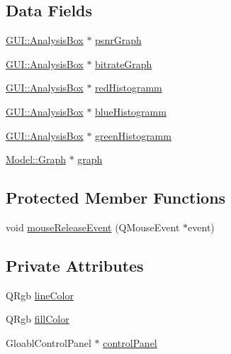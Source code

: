 \subsection*{Data Fields}
\begin{DoxyCompactItemize}
\item 
\hyperlink{classGUI_1_1AnalysisBox}{G\+U\+I\+::\+Analysis\+Box} $\ast$ \hyperlink{classGUI_1_1GraphWidget_a8eb06e20b4d45dae183529cdbcfccd37}{psnr\+Graph}
\item 
\hyperlink{classGUI_1_1AnalysisBox}{G\+U\+I\+::\+Analysis\+Box} $\ast$ \hyperlink{classGUI_1_1GraphWidget_a0820983260f94179618b2d20660fccb8}{bitrate\+Graph}
\item 
\hyperlink{classGUI_1_1AnalysisBox}{G\+U\+I\+::\+Analysis\+Box} $\ast$ \hyperlink{classGUI_1_1GraphWidget_abbcef0fcdc2fe6a2fcf4f1c7dc894616}{red\+Histogramm}
\item 
\hyperlink{classGUI_1_1AnalysisBox}{G\+U\+I\+::\+Analysis\+Box} $\ast$ \hyperlink{classGUI_1_1GraphWidget_ae1216a2a17f8e93ec56dadca439499e2}{blue\+Histogramm}
\item 
\hyperlink{classGUI_1_1AnalysisBox}{G\+U\+I\+::\+Analysis\+Box} $\ast$ \hyperlink{classGUI_1_1GraphWidget_a262e4b4b63ed00cb7e29d0e80096cc48}{green\+Histogramm}
\item 
\hyperlink{classModel_1_1Graph}{Model\+::\+Graph} $\ast$ \hyperlink{classGUI_1_1GraphWidget_ab3ea51551e457dd2373457329db2651e}{graph}
\end{DoxyCompactItemize}
\subsection*{Protected Member Functions}
\begin{DoxyCompactItemize}
\item 
void \hyperlink{classGUI_1_1GraphWidget_a35226f6549add1ff837c65888fcd00fc}{mouse\+Release\+Event} (Q\+Mouse\+Event $\ast$event)
\end{DoxyCompactItemize}
\subsection*{Private Attributes}
\begin{DoxyCompactItemize}
\item 
Q\+Rgb \hyperlink{classGUI_1_1GraphWidget_a5f3eb62decaee9fdd20d8614b2ea83c4}{line\+Color}
\item 
Q\+Rgb \hyperlink{classGUI_1_1GraphWidget_af672ce67fa21d48ceeda911a7699a8b4}{fill\+Color}
\item 
Gloabl\+Control\+Panel $\ast$ \hyperlink{classGUI_1_1GraphWidget_a22a072a13da697f378cb26be7be72abe}{control\+Panel}
\end{DoxyCompactItemize}


